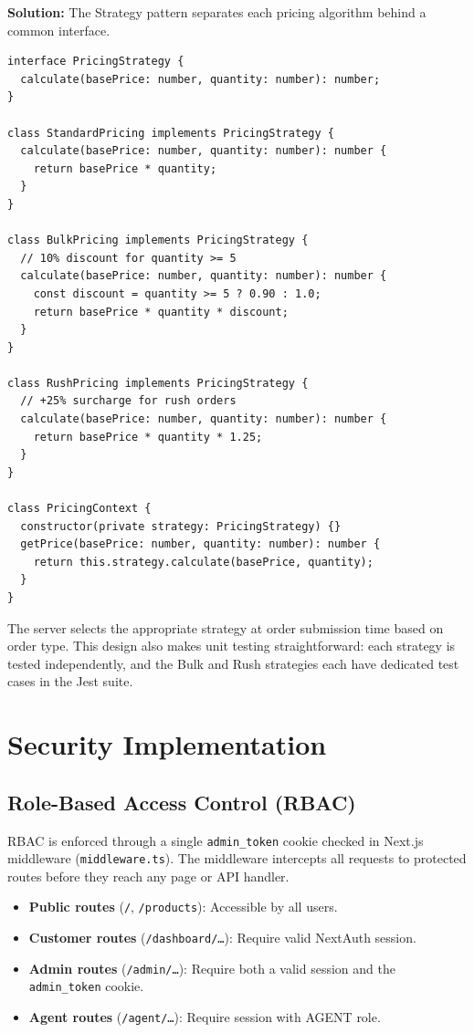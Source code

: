 \documentclass[12pt,a4paper]{report}
\begin{document}
\textbf{Solution:} The Strategy pattern separates each pricing algorithm behind a common interface.

\begin{verbatim}
interface PricingStrategy {
  calculate(basePrice: number, quantity: number): number;
}

class StandardPricing implements PricingStrategy {
  calculate(basePrice: number, quantity: number): number {
    return basePrice * quantity;
  }
}

class BulkPricing implements PricingStrategy {
  // 10% discount for quantity >= 5
  calculate(basePrice: number, quantity: number): number {
    const discount = quantity >= 5 ? 0.90 : 1.0;
    return basePrice * quantity * discount;
  }
}

class RushPricing implements PricingStrategy {
  // +25% surcharge for rush orders
  calculate(basePrice: number, quantity: number): number {
    return basePrice * quantity * 1.25;
  }
}

class PricingContext {
  constructor(private strategy: PricingStrategy) {}
  getPrice(basePrice: number, quantity: number): number {
    return this.strategy.calculate(basePrice, quantity);
  }
}
\end{verbatim}

The server selects the appropriate strategy at order submission time based on order type. This design also makes unit testing straightforward: each strategy is tested independently, and the Bulk and Rush strategies each have dedicated test cases in the Jest suite.

\section{Security Implementation}

\subsection{Role-Based Access Control (RBAC)}

RBAC is enforced through a single \texttt{admin\_token} cookie checked in Next.js middleware (\texttt{middleware.ts}). The middleware intercepts all requests to protected routes before they reach any page or API handler.

\begin{itemize}
  \item \textbf{Public routes} (\texttt{/}, \texttt{/products}): Accessible by all users.
  \item \textbf{Customer routes} (\texttt{/dashboard/\ldots}): Require valid NextAuth session.
  \item \textbf{Admin routes} (\texttt{/admin/\ldots}): Require both a valid session and the \texttt{admin\_token} cookie.
  \item \textbf{Agent routes} (\texttt{/agent/\ldots}): Require session with AGENT role.
\end{itemize}
\end{document}
